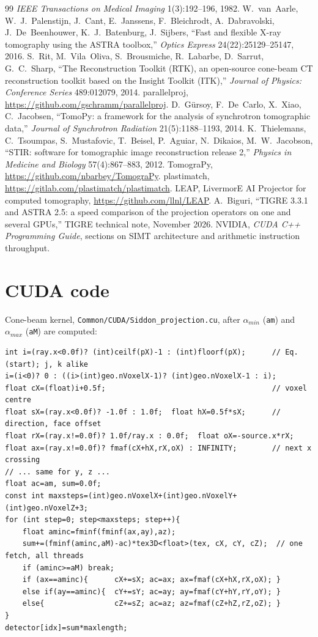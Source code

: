 \documentclass[11pt,a4paper]{article}
\theoremstyle{remark}
\begin{document}
\begin{thebibliography}{99}
\emph{IEEE Transactions on Medical Imaging} 1(3):192--196, 1982.
 W.~van~Aarle, W.~J.~Palenstijn, J.~Cant, E.~Janssens, F.~Bleichrodt, A.~Dabravolski,
J.~De~Beenhouwer, K.~J.~Batenburg, J.~Sijbers, ``Fast and flexible X-ray tomography using the ASTRA toolbox,''
\emph{Optics Express} 24(22):25129--25147, 2016.
 S.~Rit, M.~Vila~Oliva, S.~Brousmiche, R.~Labarbe, D.~Sarrut, G.~C.~Sharp, ``The Reconstruction
Toolkit (RTK), an open-source cone-beam CT reconstruction toolkit based on the Insight Toolkit (ITK),''
\emph{Journal of Physics: Conference Series} 489:012079, 2014.
 parallelproj, \url{https://github.com/gschramm/parallelproj}.
 D.~G\"ursoy, F.~De~Carlo, X.~Xiao, C.~Jacobsen, ``TomoPy: a framework for the analysis of
synchrotron tomographic data,'' \emph{Journal of Synchrotron Radiation} 21(5):1188--1193, 2014.
 K.~Thielemans, C.~Tsoumpas, S.~Mustafovic, T.~Beisel, P.~Aguiar, N.~Dikaios, M.~W.~Jacobson,
``STIR: software for tomographic image reconstruction release 2,'' \emph{Physics in Medicine and Biology}
57(4):867--883, 2012.
 TomograPy, \url{https://github.com/nbarbey/TomograPy}.
 plastimatch, \url{https://gitlab.com/plastimatch/plastimatch}.
 LEAP, LivermorE AI Projector for computed tomography, \url{https://github.com/llnl/LEAP}.
 A.~Biguri, ``TIGRE 3.3.1 and ASTRA 2.5: a speed comparison of the projection operators
on one and several GPUs,'' TIGRE technical note, November 2026.
 NVIDIA, \emph{CUDA C++ Programming Guide}, sections on SIMT architecture and arithmetic
instruction throughput.
\end{thebibliography}

\appendix
\section{CUDA code}
\label{app:code}

Cone-beam kernel, \texttt{Common/CUDA/Siddon\_projection.cu}, after $\alpha_{min}$ (\texttt{am}) and
$\alpha_{max}$ (\texttt{aM}) are computed:
\begin{lstlisting}
int i=(ray.x<0.0f)? (int)ceilf(pX)-1 : (int)floorf(pX);      // Eq. (start); j, k alike
i=(i<0)? 0 : ((i>(int)geo.nVoxelX-1)? (int)geo.nVoxelX-1 : i);
float cX=(float)i+0.5f;                                      // voxel centre
float sX=(ray.x<0.0f)? -1.0f : 1.0f;  float hX=0.5f*sX;      // direction, face offset
float rX=(ray.x!=0.0f)? 1.0f/ray.x : 0.0f;  float oX=-source.x*rX;
float ax=(ray.x!=0.0f)? fmaf(cX+hX,rX,oX) : INFINITY;        // next x crossing
// ... same for y, z ...
float ac=am, sum=0.0f;
const int maxsteps=(int)geo.nVoxelX+(int)geo.nVoxelY+(int)geo.nVoxelZ+3;
for (int step=0; step<maxsteps; step++){
    float aminc=fminf(fminf(ax,ay),az);
    sum+=(fminf(aminc,aM)-ac)*tex3D<float>(tex, cX, cY, cZ);  // one fetch, all threads
    if (aminc>=aM) break;
    if (ax==aminc){      cX+=sX; ac=ax; ax=fmaf(cX+hX,rX,oX); }
    else if(ay==aminc){  cY+=sY; ac=ay; ay=fmaf(cY+hY,rY,oY); }
    else{                cZ+=sZ; ac=az; az=fmaf(cZ+hZ,rZ,oZ); }
}
detector[idx]=sum*maxlength;
\end{lstlisting}
\end{document}
